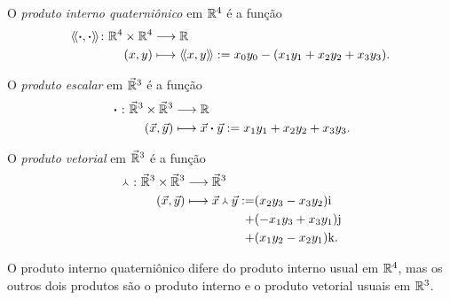 \begin{definition}
O \emph{produto interno quaterniônico} em $\mathbb{R}^4$ é a função
	\begin{align*}
	{\left\langle\!\left\langle{\bm{\cdot}},{\bm{\cdot}}\right\rangle\!\right\rangle}\colon {\mathbb{R}^4 \times \mathbb{R}^4} &\longrightarrow {\mathbb{R}} \\{(x,y)} &\longmapsto \left\langle\!\left\langle{x},{y}\right\rangle\!\right\rangle := x_0y_0 - (x_1y_1 + x_2y_2 + x_3y_3).
	\end{align*}

	O \emph{produto escalar} em $\vec{\mathbb{R}}^3$ é a função
	\begin{align*}
	{{} \bm{\cdot} {}}\colon {\vec{\mathbb{R}}^3 \times \vec{\mathbb{R}}^3} &\longrightarrow {\mathbb{R}} \\{(\vec{x},\vec{y})} &\longmapsto {\vec{x}} \bm{\cdot} {\vec{y}} := x_1y_1 + x_2y_2 + x_3y_3.
	\end{align*}

O \emph{produto vetorial} em $\vec{\mathbb{R}}^3$ é a função
	\begin{align*}
	\func{\pvec{}{}}{\vec{\R}^3 \times \vec{\R}^3}{\vec{\R}^3}{(\vec{x},\vec{y})}{
		\begin{aligned}[t]
			\pvec{\vec{x}}{\vec{y}} := &(x_2y_3-x_3y_2) \ii \\
			+ &(-x_1y_3+x_3y_1) \jj \\
			+ &(x_1y_2-x_2y_1) \kk.
		\end{aligned}
	}
	\end{align*}
\end{definition}

O produto interno quaterniônico difere do produto interno usual em $\mathbb{R}^4$, mas os outros dois produtos são o produto interno e o produto vetorial usuais em $\mathbb{R}^3$.

